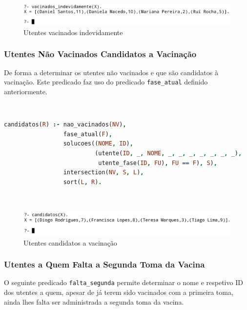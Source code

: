 \documentclass[a4paper, 11pt]{article}
\begin{document}
\

\begin{figure}[H]
    \centering
    \includegraphics[width=\textwidth]{img/vacinados_indevidamente.png}
    \caption{Utentes vacinados indevidamente}
\end{figure}

\subsubsection{Utentes Não Vacinados Candidatos a Vacinação}

De forma a determinar os utentes não vacinados e que são candidatos à vacinação. Este predicado faz uso do predicado
\texttt{fase\_atual} definido anteriormente.

\

\begin{lstlisting}[language=Prolog, caption={Extensão do predicado \texttt{candidatos}}]
% Extensao do predicado candidatos: R -> {V, F}
candidatos(R) :- nao_vacinados(NV),
                 fase_atual(F),
                 solucoes((NOME, ID), 
                          (utente(ID, _, NOME, _, _, _, _, _, _, _),
                           utente_fase(ID, FU), FU == F), S),
                 intersection(NV, S, L),
                 sort(L, R).
\end{lstlisting}

\

\begin{figure}[H]
    \centering
    \includegraphics[width=\textwidth]{img/candidatos.png}
    \caption{Utentes candidatos a vacinação}
\end{figure}

\subsubsection{Utentes a Quem Falta a Segunda Toma da Vacina}

O seguinte predicado \texttt{falta\_segunda} permite determinar o nome e respetivo ID dos utentes a quem, apesar de
já terem sido vacinados com a primeira toma, ainda lhes falta ser administrada a segunda toma da vacina. 
\end{document}
